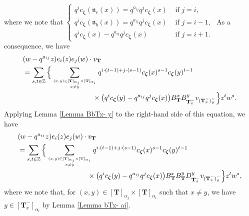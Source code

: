 \documentclass[12pt]{amsart}
\numberwithin{equation}{thm}
\newcommand\ZZ{\mathbb Z}
\newcommand\bT{\mathbf T}
\newcommand\fn{\mathfrak n}
\renewcommand\a{\alpha}  %
\newcommand\Bz{\boldsymbol\zeta}
\begin{document}
where we note that 
$
\begin{cases} 
q^i c_{\Bz} (\fn_r(x)) = q^{a_{ij}} q^j c_{\Bz} (x) &\text{ if } j=i, 
\\
q^i c_{\Bz} (\fn_b(x)) = q^{a_{ij}} q^j c_{\Bz} (x) & \text{ if } j=i-1,  
\\
q^i c_{\Bz} (x) - q^{a_{ij}} q^j c_{\Bz} (x) & \text{ if } j=i+1. 
\end{cases}
$
As a consequence, we have 
\begin{align*}
&(w- q^{a_{ij}} z) e_i(z) e_j(w) \cdot v_{\bT} 
\\
&= \sum_{s,t \in \ZZ}  
	\Big\{ \sum_{(x,y) \in [\bT]_{\a_j} \times [\bT]_{\a_i} \atop x \not=y} 
		q^{i \cdot (t-1) + j \cdot (s-1)} c_{\Bz} (x)^{s-1} c_{\Bz} (y)^{t-1} 
			\\ & \hspace{10em} \times 
			\big( q^i c_{\Bz} (y) - q^{a_{ij}} q^j c_{\Bz} (x) \big) B_{\bT}^x B_{\bT_x^-}^y v_{(\bT_x^-)_y^-} 
	\Big\} z^t w^s. 
\end{align*}
Applying Lemma \ref{Lemma BbTx- y} to the right-hand side of this equation, we have 
\begin{align}
\label{eiz ejw cbT} 
\begin{split}
&(w- q^{a_{ij}} z) e_i(z) e_j(w) \cdot v_{\bT} 
\\
&= \sum_{s,t \in \ZZ}  
	\Big\{ \sum_{(x,y) \in [\bT]_{\a_j} \times [\bT]_{\a_i} \atop x \not=y} 
		q^{i \cdot (t-1) + j \cdot (s-1)} c_{\Bz} (x)^{s-1} c_{\Bz} (y)^{t-1} 
			\\ & \hspace{10em} \times 
			\big( q^i c_{\Bz} (y) - q^{a_{ij}} q^j c_{\Bz} (x) \big) B_{\bT}^x B_{\bT}^y D_{\bT_x^-}^y v_{(\bT_x^-)_y^-} 
	\Big\} z^t w^s, 
\end{split}
\end{align}
where we note that, for $(x,y)\in [\bT]_{\a_j} \times [\bT]_{\a_i}$ such that $x \not=y$, 
we have $y \in [\bT_x^-]_{\a_i}$  by Lemma \ref{Lemma bTx- ai}. 
\end{document}
